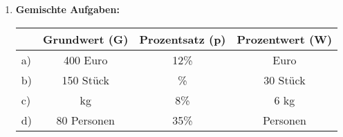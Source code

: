 \begin{enumerate}[label=\arabic*., resume]
\begin{enumerate}[label=\alph*)]
    \end{enumerate}

    \vspace{1cm}

    \item \textbf{Gemischte Aufgaben:}

    \vspace{0.5cm}

    \begin{center}
        \begin{tabular}{|l|c|c|c|}
            \hline
            & Grundwert (G) & Prozentsatz (p) & Prozentwert (W) \\
            \hline
            a) & 400 Euro & 12\% & \phantom{00} Euro \\
            \hline
            b) & 150 Stück & \phantom{00}\% & 30 Stück \\
            \hline
            c) & \phantom{000} kg & 8\% & 6 kg \\
            \hline
            d) & 80 Personen & 35\% & \phantom{00} Personen \\
            \hline
        \end{tabular}
    \end{center}

\end{enumerate}
